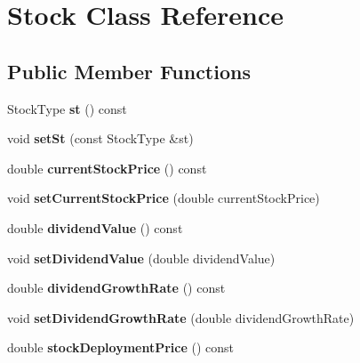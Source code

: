 \hypertarget{class_stock}{}\section{Stock Class Reference}
\label{class_stock}
\subsection*{Public Member Functions}
\begin{DoxyCompactItemize}
\item 
\hypertarget{class_stock_abbdf67b17dec5a296a047f92efefaa17}{}Stock\+Type {\bfseries st} () const \label{class_stock_abbdf67b17dec5a296a047f92efefaa17}

\item 
\hypertarget{class_stock_a3fe505ec1fb47a482652c1642ed2716f}{}void {\bfseries set\+St} (const Stock\+Type \&st)\label{class_stock_a3fe505ec1fb47a482652c1642ed2716f}

\item 
\hypertarget{class_stock_a66df397b7f3d0e83eeffba4731722e0f}{}double {\bfseries current\+Stock\+Price} () const \label{class_stock_a66df397b7f3d0e83eeffba4731722e0f}

\item 
\hypertarget{class_stock_a824904d480ca53816872061bcbe9173a}{}void {\bfseries set\+Current\+Stock\+Price} (double current\+Stock\+Price)\label{class_stock_a824904d480ca53816872061bcbe9173a}

\item 
\hypertarget{class_stock_a3ecc99a6e3710f2d726704c4fb56aefc}{}double {\bfseries dividend\+Value} () const \label{class_stock_a3ecc99a6e3710f2d726704c4fb56aefc}

\item 
\hypertarget{class_stock_aff28a5ad72684d9bf889b9a70acf0501}{}void {\bfseries set\+Dividend\+Value} (double dividend\+Value)\label{class_stock_aff28a5ad72684d9bf889b9a70acf0501}

\item 
\hypertarget{class_stock_a1c023f068fce6e0a3a3b51fb37ad0f25}{}double {\bfseries dividend\+Growth\+Rate} () const \label{class_stock_a1c023f068fce6e0a3a3b51fb37ad0f25}

\item 
\hypertarget{class_stock_ad36aaaa1b35f84d613a99331e4e45877}{}void {\bfseries set\+Dividend\+Growth\+Rate} (double dividend\+Growth\+Rate)\label{class_stock_ad36aaaa1b35f84d613a99331e4e45877}

\item 
\hypertarget{class_stock_ab9c4ee2f2fba9ac7dfbdcc8aa527ee78}{}double {\bfseries stock\+Deployment\+Price} () const \label{class_stock_ab9c4ee2f2fba9ac7dfbdcc8aa527ee78}


\end{DoxyCompactItemize}
